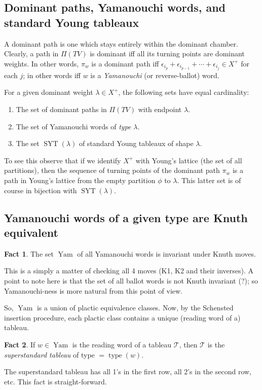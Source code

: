\documentclass[reqno]{amsart}
\theoremstyle{definition}
\newtheorem{fact}{Fact}
\newcommand{\be}{\begin{enumerate}}
\newcommand{\ee}{\end{enumerate}}
\DeclareMathOperator{\SYT}{SYT}
\DeclareMathOperator{\Yam}{Yam}
\DeclareMathOperator{\type}{type}
\begin{document}
\subsection{Dominant paths, Yamanouchi words, and standard Young tableaux} A dominant path is one which stays entirely within the dominant chamber. Clearly, a path in $\Pi(TV)$ is dominant iff all its turning points are dominant weights. In other words, $\pi_w$ is a dominant path iff $\epsilon_{i_p} + \epsilon_{i_{p-1}} + \cdots + \epsilon_{i_j} \in X^+$ for each $j$; in other words iff $w$ is a {\em Yamanouchi} (or reverse-ballot) word.

For a given dominant weight $\lambda \in X^+$, the following sets have equal cardinality:
\be
\item The set of dominant paths in $\Pi(TV)$ with endpoint $\lambda$.
\item The set of Yamanouchi words of {\em type} $\lambda$.
\item The set $\SYT(\lambda)$ of standard Young tableaux of shape $\lambda$. 
\ee

To see this observe that if we identify $X^+$ with Young's lattice (the set of all partitions), then the sequence of turning points of the
dominant path $\pi_w$ is a path in Young's lattice from the empty partition $\phi$ to $\lambda$. This latter set is of course in bijection with $\SYT(\lambda)$.


\subsection{Yamanouchi words of a given type are Knuth equivalent}
\begin{fact}
  The set $\Yam$ of all Yamanouchi words is invariant under Knuth moves.
\end{fact}
This is a simply a matter of checking all 4 moves (K1, K2 and their inverses).
A point to note here is that the set of all ballot words is not Knuth invariant (?); so Yamanouchi-ness is more natural from this point of view.

So, $\Yam$ is a union of plactic equivalence classes. 
Now, by the Schensted insertion procedure, each plactic class contains a unique (reading word of a) tableau. 
\begin{fact}
If $w \in \Yam$ is the reading word of a tableau $\mathcal{T}$, then $\mathcal{T}$ is the {\em superstandard tableau} of type $= \type(w)$.
\end{fact}
The superstandard tableau has all 1's in the first row, all 2's in the second row, etc. This fact is straight-forward.
\end{document}
